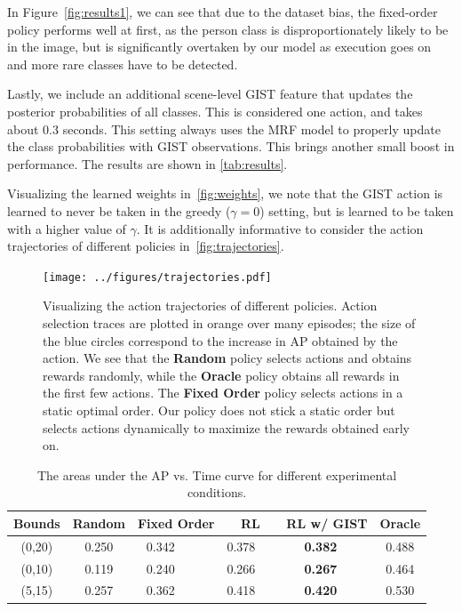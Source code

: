 In Figure~\autoref{fig:results1}, we can see that due to the dataset bias, the fixed-order policy performs well at first, as the person class is disproportionately likely to be in the image, but is significantly overtaken by our model as execution goes on and more rare classes have to be detected.

Lastly, we include an additional scene-level GIST feature that updates the posterior probabilities of all classes.
This is considered one action, and takes about $0.3$ seconds.
This setting always uses the MRF model to properly update the class probabilities with GIST observations.
This brings another small boost in performance.
The results are shown in \autoref{tab:results}.

Visualizing the learned weights in~\autoref{fig:weights}, we note that the GIST action is learned to never be taken in the greedy ($\gamma=0$) setting, but is learned to be taken with a higher value of $\gamma$.
It is additionally informative to consider the action trajectories of different policies in~\autoref{fig:trajectories}.

\begin{figure}[h!]
  \centering
  \texttt{[image: ../figures/trajectories.pdf]}
  \caption{
Visualizing the action trajectories of different policies.
Action selection traces are plotted in orange over many episodes; the size of the blue circles correspond to the increase in AP obtained by the action.
We see that the \textbf{Random} policy selects actions and obtains rewards randomly, while the \textbf{Oracle} policy obtains all rewards in the first few actions.
The \textbf{Fixed Order} policy selects actions in a static optimal order.
Our policy does not stick a static order but selects actions dynamically to maximize the rewards obtained early on.
}
  \label{fig:trajectories}
\end{figure}

\begin{table}[t]
\caption{The areas under the AP vs. Time curve for different experimental conditions.}
\label{tab:results}
\begin{center}
\begin{tabular}{|c|c|c|c|c|c|}
\hline
Bounds & Random & Fixed Order & RL        & RL w/ GIST         & Oracle \\ \hline
(0,20) & 0.250  & 0.342       & 0.378     & \textbf{0.382}  & 0.488 \\ 
(0,10) & 0.119  & 0.240       & 0.266     & \textbf{0.267}  & 0.464 \\ 
(5,15) & 0.257  & 0.362       & 0.418     & \textbf{0.420}  & 0.530 \\ \hline
\end{tabular}
\end{center}
\end{table}

